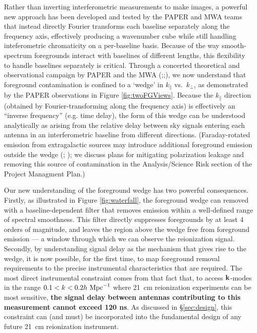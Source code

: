 \documentclass[preprint]{aastex}
\newcommand{\Mycitealt}[1]{{\bf \citealt{#1}}}
\def\kperp{k_{\bot}}
\def\kpar{k_{\|}}
\def\kperp{k_{\bot}}
\def\kpar{k_{\|}}
\def\k{{\bf k}}
\begin{document}
Rather than inverting interferometric measurements to make images,
a powerful new approach has been developed and tested by the PAPER
and MWA teams that instead directly Fourier transforms each baseline separately along the frequency axis,
effectively producing a wavenumber cube while still handling inteferometric
chromaticity on a per-baseline basis.  Because of the way smooth-spectrum foregrounds
interact with baselines of different lengths, this flexibility to handle
baselines separately is critical.
Through a concerted theoretical and observational campaign by PAPER and the MWA
(\Mycitealt{morales_et_al2012,parsons_et_al2012b};\citealt{vedantham_2012};\Mycitealt{Datta_2010,hazelton_et_al2013,pober_et_al2013,parsons_et_al2013,dillon_et_al2013b}),
we now understand that foreground contamination is confined to a `wedge' in
$\kpar$ vs.\ $\kperp$, as demonstrated by the PAPER observations in 
Figure \ref{fig:twoFGViews}. Because the $\kpar$ direction (obtained by
Fourier-transforming along the frequency axis) is effectively an ``inverse frequency'' (e.g. time delay),
the form of this wedge can be understood analytically as arising from the relative delay between sky signals
entering each antenna in an interferometric baseline from different directions.
(Faraday-rotated emission from extragalactic sources may introduce additional foreground emission outside the wedge (\citealt{labropoulos_et_al2009,jelic_et_al2010}; \Mycitealt{moore_et_al2013});
we discuss plans for mitigating polarization leakage and removing this source
of contamination in the Analysis/Science Risk section of the Project Managment Plan.)

Our new understanding of the foreground wedge has two powerful consequences.
Firstly, as illustrated in Figure \ref{fig:waterfall}, the foreground wedge can
removed with a baseline-dependent filter that removes emission within a well-defined range of spectral smoothness.
This filter directly suppresses foregrounds by at least
4 orders of magnitude,  
and leaves the region above the wedge free from 
foreground emission --- a window through which we can observe the reionization signal.
Secondly, by understanding signal delay as the mechanism that gives rise to the wedge,
it is now possible, for the first time, to map foreground removal requirements 
to the precise instrumental characteristics that are required.  The most direct instrumental
constraint comes from that fact that, to access $\k$-modes in the range $0.1<k<0.2h\ {\rm Mpc}^{-1}$
where 21~cm reionization experiments can be most sensitive, {\bf the signal delay between antennas
contributing to this measurement cannot exceed 120 ns}.  As discussed in \S\ref{sec:design}, this
constraint can (and must) be incorporated into the fundamental design of any future 21~cm reionization instrument.
\end{document}
